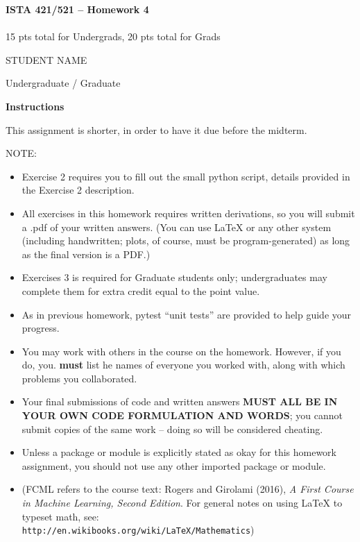 \documentclass[10pt]{article}
\newcommand{\latex}{\LaTeX\xspace}
\begin{document}
\begin{center}
    {\Large {\bf ISTA 421/521 -- Homework 4}} \\
     \\
    15 pts total for Undergrads, 20 pts total for Grads\\

\end{center}

\begin{flushright}
STUDENT NAME %

Undergraduate / Graduate %
\end{flushright}

\vspace{1cm}
{\Large {\bf Instructions}}

This assignment is shorter, in order to have it due before the midterm.

NOTE: 
\begin{itemize} 
    \item Exercise 2 requires you to fill out the small python script, details provided
in the Exercise 2 description. 
    \item All exercises in this homework requires written
derivations, so you will submit a .pdf of your written answers. (You can use
\latex or any other system (including handwritten; plots, of course, must be
program-generated) as long as the final version is a PDF.)
    \item Exercises 3 is required for Graduate students only; undergraduates may complete them for extra credit equal to the point value.
    \item As in previous homework, pytest ``unit tests'' are provided to help guide your progress.
    \item You may work with others in the course on the homework. However, if you do, you. {\bf must} list he names of everyone you worked with, along with which problems you collaborated. 
    \item Your final submissions of code and written answers {\bf MUST ALL BE IN YOUR OWN CODE FORMULATION AND WORDS}; you cannot submit copies of the same work -- doing so will be considered cheating.
    \item Unless a package or module is explicitly stated as okay for this homework assignment, you should not use any other imported package or module.
    \item (FCML refers to the course text: Rogers and Girolami (2016), {\em A First Course in Machine Learning, Second Edition}.  For general notes on using \latex to typeset math, see:\\ {\tt http://en.wikibooks.org/wiki/LaTeX/Mathematics})
\vspace{.5cm}
\end{itemize}
\end{document}
